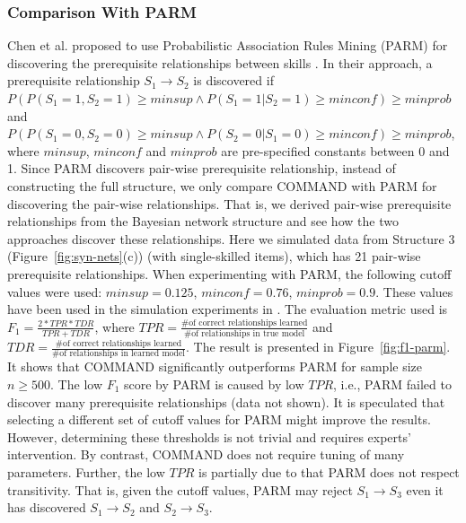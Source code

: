 \documentclass{edm_template}
\begin{document}
	\subsubsection{Comparison With PARM}
	Chen et al. proposed to use Probabilistic Association Rules Mining (PARM) for discovering the prerequisite relationships between skills \cite{chen2015discovering}.
	In their approach, a prerequisite relationship $S_1\rightarrow S_2$ is discovered if
	$P(P(S_1=1,S_2=1) \ge minsup \wedge P(S_1=1|S_2=1)\ge minconf) \ge minprob$ and $P(P(S_1=0,S_2=0) \ge minsup \wedge P(S_2=0|S_1=0)\ge minconf) \ge minprob$, 
	where $minsup$, $minconf$ and $minprob$ are pre-specified constants between 0 and 1.
	Since PARM discovers pair-wise prerequisite relationship, instead of constructing the full structure,
	we only compare COMMAND with PARM for discovering the pair-wise relationships.
	That is, we derived pair-wise prerequisite relationships from the Bayesian network structure and see how the two approaches discover these relationships.
	Here we simulated data from Structure 3 (Figure~\ref{fig:syn-nets}(c)) (with single-skilled items), which has 21 pair-wise prerequisite relationships.
	When experimenting with PARM, the following cutoff values were used: $ minsup=0.125$, $minconf=0.76$, $minprob=0.9$.
	These values have been used in the simulation experiments in \cite{chen2015discovering}.
	The evaluation metric used is $F_1=\frac{2*TPR*TDR}{TPR+TDR}$, where $TPR=\frac{\text{\# of correct relationships learned}}{\text{\# of relationships in true model}}$
	and $TDR=\frac{\text{\# of correct relationships learned}}{\text{\# of relationships in learned model}}$.
	The result is presented in Figure~\ref{fig:f1-parm}. It shows that COMMAND significantly outperforms PARM for sample size $n\ge 500$.
	The low $F_1$ score by PARM is caused by low $TPR$, i.e., PARM failed to discover many prerequisite relationships (data not shown).
	It is speculated that selecting a different set of cutoff values for PARM might improve the results.
	However, determining these thresholds is not trivial and requires experts' intervention. By contrast, COMMAND does not require tuning of many parameters.
	Further, the low $TPR$ is partially due to that PARM does not respect transitivity.
	That is, given the cutoff values, PARM may reject $S_1\rightarrow S_3$ even it has discovered $S_1\rightarrow S_2$ and $S_2\rightarrow S_3$.
	
\end{document}

